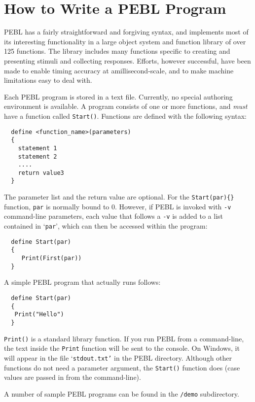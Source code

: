 
\chapter{How to Write a PEBL Program}

\vfill
{}

PEBL has a fairly straightforward and forgiving syntax, and implements
most of its interesting functionality in a large object system and
function library of over 125 functions.  The library includes many
functions specific to creating and presenting stimuli and collecting
responses.  Efforts, however successful, have been made to enable
timing accuracy at amillisecond-scale, and to make machine limitations
easy to deal with.


Each PEBL program is stored in a text file. Currently, no
special authoring environment is available. A program
consists of one or more functions, and \emph{must} have a function
called \texttt{Start()}. Functions are defined with the following
syntax:
\begin{verbatim}
  define <function_name>(parameters)
  {
    statement 1
    statement 2
    ....
    return value3
  }
\end{verbatim}
The parameter list and the return value are optional.  For the
\verb+Start(par){}+ function, \texttt{par} is normally bound to 0.
However, if PEBL is invoked with \texttt{-v} command-line parameters,
each value that follows a \texttt{-v} is added to a list contained in
`\texttt{par}', which can then be accessed within the program:
\begin{verbatim}
  define Start(par)
  {
     Print(First(par))
  }
\end{verbatim}
A simple PEBL program that actually runs follows:
\begin{verbatim}
  define Start(par)
  {
   Print("Hello")
  }
\end{verbatim}
\texttt{Print()} is a standard library function. If you run PEBL from a
command-line, the text inside the \texttt{Print} function will be sent to the
console. On Windows, it will appear in the file `\texttt{stdout.txt'} in the
PEBL directory.  Although other functions do not need a parameter
argument, the \texttt{Start()} function does (case values are passed in
from the command-line).

A number of sample PEBL programs can be found in the \texttt{/demo}
 subdirectory.



\vfill
{}

